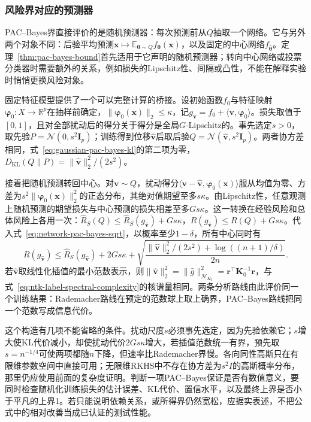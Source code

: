 \subsubsection{风险界对应的预测器}

PAC--Bayes界直接评价的是随机预测器：每次预测前从$Q$抽取一个网络。它与另外两个对象不同：后验平均预测$\bm x\mapsto\mathbb E_{\bm\theta\sim Q}f_{\bm\theta}(\bm x)$，以及固定的中心网络$f_{\hat{\bm\theta}}$。定理~\ref{thm:pac-bayes-bound}首先适用于它声明的随机预测器；转向中心网络或投票分类器时需要额外的关系，例如损失的Lipschitz性、间隔或凸性，不能在解释实验时悄悄更换风险对象。

固定特征模型提供了一个可以完整计算的桥接。设初始函数$f_0$与特征映射$\bm\varphi_0:X\to\mathbb R^p$在抽样前确定，$\|\bm\varphi_0(\bm x)\|_2\leq\kappa$，记$g_{\bm v}=f_0+\langle\bm v,\bm\varphi_0\rangle$。损失取值于$[0,1]$，且对全部扰动后的得分关于得分是全局$G$-Lipschitz的。事先选定$s>0$，取先验$P=\mathcal N(0,s^2\bm I_p)$；训练得到位移$\widehat{\bm v}$后取后验$Q=\mathcal N(\widehat{\bm v},s^2\bm I_p)$。两者协方差相同，式~\eqref{eq:gaussian-pac-bayes-kl}的第二项为零，$D_{\mathrm{KL}}(Q\|P)=\|\widehat{\bm v}\|_2^2/(2s^2)$。

接着把随机预测转回中心。对$\bm v\sim Q$，扰动得分$\langle\bm v-\widehat{\bm v},\bm\varphi_0(\bm x)\rangle$服从均值为零、方差为$s^2\|\bm\varphi_0(\bm x)\|_2^2$的正态分布，其绝对值期望至多$s\kappa$。由Lipschitz性，任意观测上随机预测的期望损失与中心预测的损失相差至多$Gs\kappa$。这一转换在经验风险和总体风险上各用一次：$\hat R_S(Q)\leq\hat R_S(g_{\widehat{\bm v}})+Gs\kappa$，$R(g_{\widehat{\bm v}})\leq R(Q)+Gs\kappa$。代入式~\eqref{eq:network-pac-bayes-sqrt}，以概率至少$1-\delta$，所有中心同时有
\begin{equation}
 R(g_{\widehat{\bm v}})\leq\hat R_S(g_{\widehat{\bm v}})+2Gs\kappa
 +\sqrt{\frac{\|\widehat{\bm v}\|_2^2/(2s^2)+\log((n+1)/\delta)}{2n}}.
 \label{eq:ntk-pac-bayes-risk}
\end{equation}
若$\widehat{\bm v}$取线性化插值的最小范数表示，则$\|\widehat{\bm v}\|_2^2=\|\widehat g\|_{\mathcal H_{K_0}}^2=\bm r^\top\bm K_0^{-1}\bm r$，与式~\eqref{eq:ntk-label-spectral-complexity}的核谱量相同。两条分析路线由此评价同一个训练结果：Rademacher路线在预定的范数球上取上确界，PAC--Bayes路线把同一个范数写成信息代价。

这个构造有几项不能省略的条件。扰动尺度$s$必须事先选定，因为先验依赖它；$s$增大使KL代价减小，却使扰动代价$2Gs\kappa$增大，若插值范数统一有界，预先取$s=n^{-1/4}$可使两项都随$n$下降，但速率比Rademacher界慢。各向同性高斯只在有限维参数空间中直接可用；无限维RKHS中不存在协方差为$s^2I$的高斯概率分布，那里仍应使用前面的复杂度证明。判断一项PAC--Bayes保证是否有数值意义，要同时检查随机化训练损失的估计误差、KL代价、置信水平，以及最终上界是否小于平凡的上界1。若只能说明依赖关系，或所得界仍然宽松，应据实表述，不把公式中的相对改善当成已认证的测试性能。


